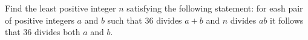 Find the least positive integer  $n$ satisfying the following statement: for eash pair of positive integers $a$ and $b$ such that $36$ divides  $a+b$ and $n$ divides $ab$ it follows that $36$ divides both  $a$ and $b$.